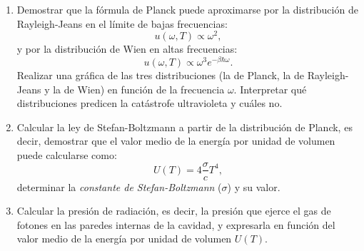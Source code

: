 \documentclass[a4paper,11pt]{article}
\begin{document}
\begin{enumerate}[label=(\alph*),
                  leftmargin=2\parindent,
                  rightmargin=2\parindent]
     \item{Demostrar que la fórmula de Planck puede aproximarse por la 
           distribución de Rayleigh-Jeans en el límite de bajas frecuencias:
           $$ u(\omega, T) \propto \omega^2, $$
           y por la distribución de Wien en altas frecuencias:
           $$ u(\omega, T) \propto \omega^3 e^{-\beta \hbar \omega}. $$
           Realizar una gráfica de las tres distribuciones (la de Planck, la 
           de Rayleigh-Jeans y la de Wien) en función de la frecuencia 
           $\omega$.
           Interpretar qué distribuciones predicen la catástrofe 
           ultravioleta y cuáles no.
           }
     
     \item{Calcular la ley de Stefan-Boltzmann a partir de la distribución 
           de Planck, es decir, demostrar que el valor medio de la energía 
           por unidad de volumen puede calcularse como:
           $$ U(T) = 4 \frac{\sigma}{c} T^4, $$
           determinar la \emph{constante de Stefan-Boltzmann} ($\sigma$) y su 
           valor.
           }
     
     \item{Calcular la presión de radiación, es decir, la presión que 
           ejerce el gas de fotones en las paredes internas de la cavidad, y 
           expresarla en función del valor medio de la energía por unidad de 
           volumen $U(T)$.
           }

\end{enumerate}
\end{document}
